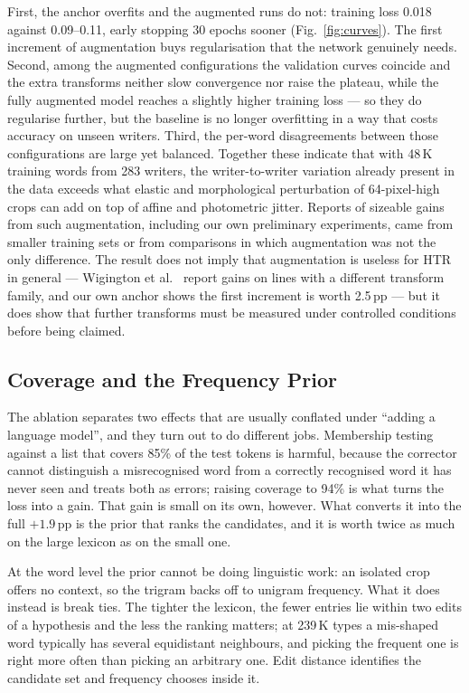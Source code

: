 \documentclass[conference]{IEEEtran}
\begin{document}
First, the anchor overfits and the augmented runs do not: training
loss 0.018 against 0.09--0.11, early stopping 30 epochs sooner
(Fig.~\ref{fig:curves}). The first increment of augmentation buys
regularisation that the network genuinely needs. Second, among the
augmented configurations the validation curves coincide and the extra
transforms neither slow convergence nor raise the plateau, while the
fully augmented model reaches a slightly higher training loss --- so
they do regularise further, but the baseline is no longer overfitting
in a way that costs accuracy on unseen writers. Third, the per-word
disagreements between those configurations are large yet balanced.
Together these indicate that with 48\,K training words from 283
writers, the writer-to-writer variation already present in the data
exceeds what elastic and morphological perturbation of 64-pixel-high
crops can add on top of affine and photometric jitter. Reports of
sizeable gains from such augmentation, including our own preliminary
experiments, came from smaller training sets or from comparisons in
which augmentation was not the only difference. The result does not
imply that augmentation is useless for HTR in general --- Wigington et
al.~\cite{wigington2017data} report gains on lines with a different
transform family, and our own anchor shows the first increment is
worth 2.5\,pp --- but it does show that further transforms must be
measured under controlled conditions before being claimed.

\subsection{Coverage and the Frequency Prior}
\label{sec:disc-lex}

The ablation separates two effects that are usually conflated under
``adding a language model'', and they turn out to do different jobs.
Membership testing against a list that covers 85\% of the test tokens
is harmful, because the corrector cannot distinguish a misrecognised
word from a correctly recognised word it has never seen and treats
both as errors; raising coverage to 94\% is what turns the loss into
a gain. That gain is small on its own, however. What converts it into
the full $+1.9$\,pp is the prior that ranks the candidates, and it is
worth twice as much on the large lexicon as on the small one.

At the word level the prior cannot be doing linguistic work: an
isolated crop offers no context, so the trigram backs off to unigram
frequency. What it does instead is break ties. The tighter the
lexicon, the fewer entries lie within two edits of a hypothesis and
the less the ranking matters; at 239\,K types a mis-shaped word
typically has several equidistant neighbours, and picking the frequent
one is right more often than picking an arbitrary one. Edit distance identifies the candidate set and
frequency chooses inside it.
\end{document}
